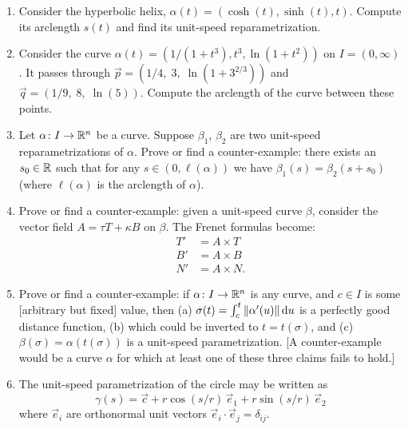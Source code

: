 \begin{enumerate}
\item Consider the hyperbolic helix,
  $\alpha(t)=(\cosh(t),\sinh(t),t)$. Compute its arclength $s(t)$ and
  find its unit-speed reparametrization.
\item Consider the curve $\alpha(t) = (1/(1+t^{3}), t^{3}, \ln(1+t^{2}))$ on $I=(0,\infty)$.
  It passes through $\vec{p}=(1/4,\;3,\;\ln(1+3^{2/3}))$ and
  $\vec{q} = (1/9,\; 8,\; \ln(5))$.
  Compute the arclength of the curve between these points.
\item Let $\alpha\colon I\to\mathbb{R}^{n}$ be a curve. Suppose $\beta_{1}$,
  $\beta_{2}$ are two unit-speed reparametrizations of $\alpha$.
  Prove or find a counter-example: there exists an $s_{0}\in\mathbb{R}$ such
  that for any $s\in (0, \ell(\alpha))$ we have $\beta_{1}(s)=\beta_{2}(s+s_{0})$
  (where $\ell(\alpha)$ is the arclength of $\alpha$).
\item Prove or find a counter-example: given a unit-speed curve $\beta$,
  consider the vector field $A=\tau T+\kappa B$ on $\beta$. The Frenet
  formulas become:
  \begin{align*}
    T' &= A\times T\\
    B' &= A\times B\\
    N' &= A\times N.
  \end{align*}
\item Prove or find a counter-example: if $\alpha\colon I\to\mathbb{R}^{n}$ is
  any curve, and $c\in I$ is some [arbitrary but fixed] value, then
  (a) $\sigma(t) = \int^{t}_{c}\|\alpha'(u)\|\,\mathrm{d} u$ is a perfectly good
  distance function, (b) which could be inverted to $t=t(\sigma)$, and
  (c) $\beta(\sigma) = \alpha(t(\sigma))$ is a unit-speed
  parametrization. [A counter-example would be a curve $\alpha$ for
    which at least one of these three claims fails to hold.]
\item The unit-speed parametrization of the circle may be written as
  \begin{equation}
\gamma(s) = \vec{c} + r\cos(s/r)\,\vec{e}_{1} + r\sin(s/r)\,\vec{e}_{2}
  \end{equation}
  where $\vec{e}_{i}$ are orthonormal unit vectors $\vec{e}_{i}\cdot\vec{e}_{j}=\delta_{ij}$.


\end{enumerate}
